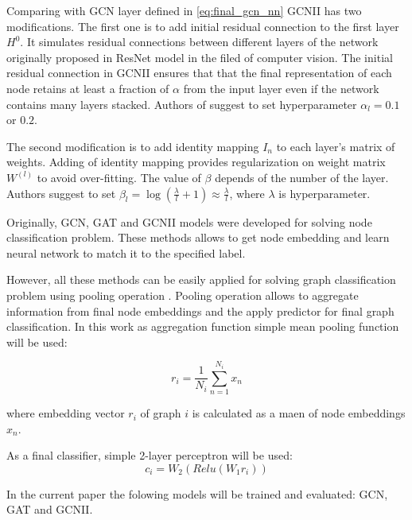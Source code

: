 Comparing with GCN layer defined in \ref{eq:final_gcn_nn} GCNII has two modifications.
The first one is to add initial residual connection to the first layer $H^0$. It simulates 
residual connections between different layers of the network originally proposed in 
ResNet model \cite{ResNet} in the filed of computer vision. 
The initial residual connection in GCNII ensures that that the final representation
of each node retains at least a fraction of $\alpha$ from the input layer even if the network contains
many layers stacked. Authors of \cite{GCNII} suggest to set hyperparameter $\alpha_l = 0.1$ or $0.2$.


The second modification is to add identity mapping $I_n$ to each layer's matrix of weights.
Adding of identity mapping provides regularization on weight matrix $W^(l)$ to avoid over-fitting.
The value of $\beta$ depends of the number of the layer. Authors suggest to set $\beta_l = \log(\frac{\lambda}{l}+1) \approx \frac{\lambda}{l}$,
where $\lambda$ is hyperparameter. 



Originally, GCN, GAT and GCNII models were developed for solving node classification problem.
These methods allows to get node embedding and learn neural network to match it to the specified label.

However, all these methods can be easily applied for solving graph classification problem using pooling operation \cite{distillGCN}.
Pooling operation allows to aggregate information from final node embeddings and the apply predictor for final graph classification.
In this work as aggregation function simple mean pooling function will be used:

\begin{equation}
    r_i = \frac{1}{N_i}\sum_{n=1}^{N_i}x_n
    \label{eq:mean_pool}
\end{equation}

where embedding vector $r_i$ of graph $i$ is calculated as a maen of node embeddings $x_n$.

As a final classifier, simple 2-layer perceptron will be used:
\begin{equation}
    c_i = W_2(Relu(W_1r_i))
    \label{eq:final_classifier}
\end{equation}


In the current paper the folowing models will be trained and evaluated: GCN\cite{GCN}, GAT\cite{GAT} and GCNII\cite{GCNII}.